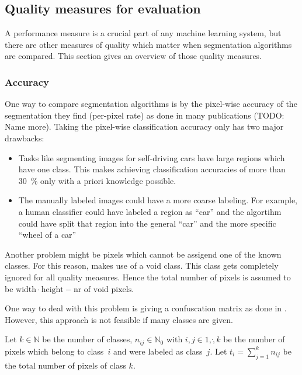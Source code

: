\subsection{Quality measures for evaluation}%
\label{subsec:quality-measures}%
A performance measure is a crucial part of any machine learning system, but
there are other measures of quality which matter when segmentation algorithms
are compared. This section gives an overview of those quality measures.


\subsubsection{Accuracy}
One way to compare segmentation algorithms is by the pixel-wise accuracy of the
segmentation they find (per-pixel rate) as done in many publications
\cite{shotton2006textonboost} (TODO: Name more). Taking the pixel-wise
classification accuracy only has two major drawbacks:

\begin{itemize}
    \item Tasks like segmenting images for self-driving cars have large regions
          which have one class. This makes achieving classification accuracies
          of more than \SI{30}{\percent} only with a priori knowledge possible.
    \item The manually labeled images could have a more coarse labeling. For
          example, a human classifier could have labeled a region as
          \enquote{car} and the algortihm could have split that region into
          the general \enquote{car} and the more specific \enquote{wheel of a
          car}
\end{itemize}

Another problem might be pixels which cannot be assigend one of the known
classes. For this reason, \cite{shotton2006textonboost} makes use of a void
class. This class gets completely ignored for all quality measures. Hence the
total number of pixels is assumed to be $\text{width} \cdot \text{height} - \text{nr of void pixels}$.

One way to deal with this problem is giving a confuscation matrix as done in
\cite{shotton2006textonboost}. However, this approach is not feasible if many
classes are given.

Let $k \in \mathbb{N}$ be the number of classes, $n_{ij} \in \mathbb{N}_0$ with
$i,j \in 1, \dot, k$ be the number of pixels which belong to class~$i$ and were
labeled as class~$j$. Let $t_i = \sum_{j=1}^k n_{ij}$ be the total number of
pixels of class $k$.

